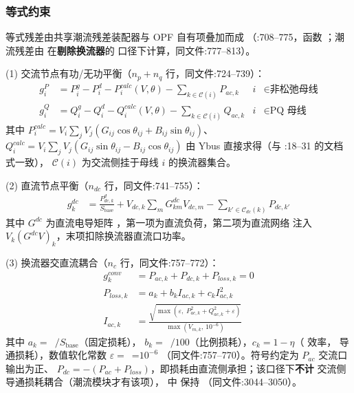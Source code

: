 \subsubsection*{等式约束}
等式残差由共享潮流残差装配器与 OPF 自有项叠加而成
（:708--775，函数
；潮流残差由
 在\textbf{剔除换流器}的
口径下计算，同文件:777--813）。

(1) 交流节点有功/无功平衡（$n_p+n_q$ 行，同文件:724--739）：
\begin{align*}
g^{P}_i &= P^{g}_i - P^{d}_i - P^{calc}_i(V,\theta) - \sum_{k\in\mathcal{C}(i)} P_{ac,k}
 & i &\in \text{非松弛母线}\\
g^{Q}_i &= Q^{g}_i - Q^{d}_i - Q^{calc}_i(V,\theta) - \sum_{k\in\mathcal{C}(i)} Q_{ac,k}
 & i &\in \text{PQ 母线}
\end{align*}
其中 $P^{calc}_i=V_i\sum_j V_j(G_{ij}\cos\theta_{ij}+B_{ij}\sin\theta_{ij})$、
$Q^{calc}_i=V_i\sum_j V_j(G_{ij}\sin\theta_{ij}-B_{ij}\cos\theta_{ij})$ 由 Ybus
直接求得（与 :18--31 的文档式一致），
$\mathcal{C}(i)$ 为交流侧挂于母线 $i$ 的换流器集合。

(2) 直流节点平衡（$n_{dc}$ 行，同文件:741--755）：
\begin{align*}
g^{dc}_k &= \frac{P^{d}_{dc,k}}{S_{\mathrm{base}}}
  + V_{dc,k}\sum_{m} G^{dc}_{km}V_{dc,m} - \sum_{k'\in\mathcal{C}_{dc}(k)} P_{dc,k'}
\end{align*}
其中 $G^{dc}$ 为直流电导矩阵 ，第一项为直流负荷，第二项为直流网络
注入 $V_k(G^{dc}V)_k$，末项扣除换流器直流口功率。

(3) 换流器交直流耦合（$n_c$ 行，同文件:757--772）：
\begin{align*}
g^{conv}_k &= P_{ac,k} + P_{dc,k} + P_{loss,k} = 0\\
P_{loss,k} &= a_k + b_k I_{ac,k} + c_k I_{ac,k}^{2}\\
I_{ac,k} &= \frac{\sqrt{\max(\varepsilon,\;P_{ac,k}^{2}+Q_{ac,k}^{2}+\varepsilon)}}
                    {\max(V_{m,k},\,10^{-6})}
\end{align*}
其中 $a_k=$~$/S_{\mathrm{base}}$（固定损耗），
$b_k=$~$/100$（比例损耗），$c_k=1-\eta$（ 效率，
导通损耗），数值软化常数 $\varepsilon=$~=$10^{-6}$
（同文件:757--770）。符号约定为 $P_{ac}$ 交流口输出为正、
$P_{dc}=-(P_{ac}+P_{loss})$，即损耗由直流侧承担；该口径下\textbf{不计}
 交流侧导通损耗耦合（潮流模块才有该项），
 中 
保持 （同文件:3044--3050）。

